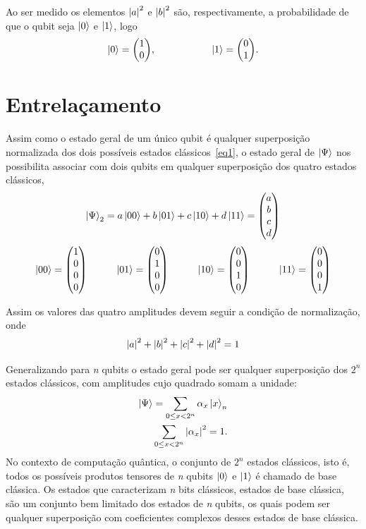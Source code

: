 \documentclass[a4paper, 12pt, oneside]{book}
\begin{document}
Ao ser medido os elementos $\abs{a}^2$ e $\abs{b}^2$ são, respectivamente, a probabilidade de que o qubit seja $\ket{0}$ e $\ket{1}$, logo 
\begin{align*} 
  \ket{0} = \mqty(1\\0) ,\hspace{2cm} 
  \ket{1} = \mqty(0\\1).
\end{align*}


\section{Entrelaçamento}
Assim como o estado geral de um único qubit é qualquer superposição normalizada dos dois possíveis estados clássicos~\eqref{eq1}, o estado geral de $\ket{\Psi}$ nos possibilita associar com dois qubits em qualquer superposição dos quatro estados clássicos,
\begin{equation}\label{eq3}
\ket{\Psi}_2 = a\ket{00} + b\ket{01} + c\ket{10} + d\ket{11} = \mqty(a\\b\\c\\d)
\end{equation}
\begin{align*}
  \ket{00} = \mqty(1\\0\\0\\0) \hspace{1cm} 
  \ket{01} = \mqty(0\\1\\0\\0) \hspace{1cm} 
  \ket{10} = \mqty(0\\0\\1\\0) \hspace{1cm} 
  \ket{11} = \mqty(0\\0\\0\\1)
\end{align*}

Assim os valores das quatro amplitudes devem seguir a condição de normalização, onde
\begin{equation}\label{eq4}
\abs{a}^2 + \abs{b}^2 + \abs{c}^2 + \abs{d}^2 = 1
\end{equation}

Generalizando para \textit{n} qubits o estado geral pode ser qualquer superposição dos $2^n$ estados clássicos, com amplitudes cujo quadrado somam a unidade:
\begin{align*}
\ket{\Psi} = \sum_{0\leq x<2^n} \alpha_x\ket{x}_n \\
\sum_{0\leq x<2^n} \abs{\alpha_x}^2 = 1.
\end{align*}
No contexto de computação quântica, o conjunto de $2^n$ estados clássicos, isto é, todos os possíveis produtos tensores de \textit{n} qubits $\ket{0}$ e $\ket{1}$ é chamado de base clássica. Os estados que caracterizam \textit{n} bits clássicos, estados de base clássica, são um conjunto bem limitado dos estados de \textit{n} qubits, os quais podem ser qualquer superposição com coeficientes complexos desses estados de base clássica.
\end{document}
